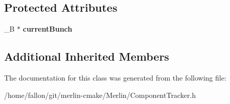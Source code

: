 \subsection*{Protected Attributes}
\begin{DoxyCompactItemize}
\item 
\mbox{\label{classTBunchCMPTracker_1_1B__Integrator_afe34e0eab12b5077fa154034943f3ea5}} 
\+\_\+B $\ast$ {\bfseries current\+Bunch}
\end{DoxyCompactItemize}
\subsection*{Additional Inherited Members}


The documentation for this class was generated from the following file\+:\begin{DoxyCompactItemize}
\item 
/home/fallon/git/merlin-\/cmake/\+Merlin/Component\+Tracker.\+h\end{DoxyCompactItemize}
